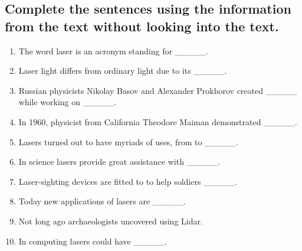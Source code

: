 \subsection*{Complete the sentences using the information from the text without
      looking into the text.}
\begin{enumerate}
      \item The word laser is an acronym standing for \_\_\_\_\_.
      \item Laser light differs from ordinary light due to its \_\_\_\_\_.
      \item Russian physicists Nikolay Basov and Alexander Prokhorov created \_\_\_\_\_
            while working on \_\_\_\_\_.
      \item In 1960, physicist from California Theodore Maiman demonstrated \_\_\_\_\_.
      \item Lasers turned out to have myriads of uses, from \underline{\hspace{2cm}} to \_\_\_\_\_.
      \item In science lasers provide great assistance with \_\_\_\_\_.
      \item Laser-sighting devices are fitted to \underline{\hspace{2cm}} to help soldiers \_\_\_\_\_.
      \item Today new applications of lasers are \_\_\_\_\_.
      \item Not long ago archaeologists uncovered \underline{\hspace{2cm}} using Lidar.
      \item In computing lasers could have \_\_\_\_\_.
\end{enumerate}

